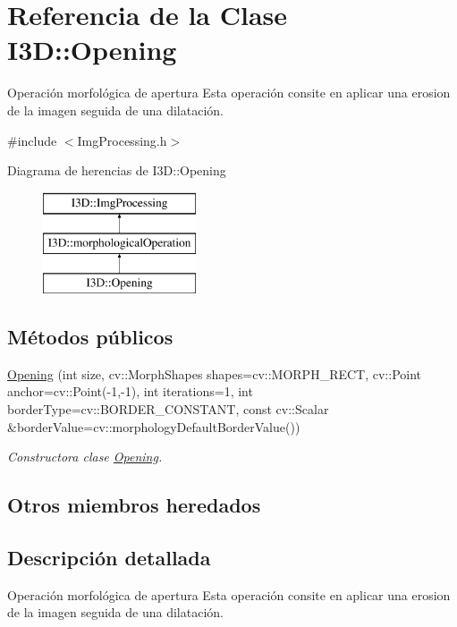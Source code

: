 \hypertarget{class_i3_d_1_1_opening}{}\section{Referencia de la Clase I3D\+:\+:Opening}
\label{class_i3_d_1_1_opening}


Operación morfológica de apertura Esta operación consite en aplicar una erosion de la imagen seguida de una dilatación.  




{\ttfamily \#include $<$Img\+Processing.\+h$>$}

Diagrama de herencias de I3D\+:\+:Opening\begin{figure}[H]
\begin{center}
\leavevmode
\includegraphics[height=3.000000cm]{class_i3_d_1_1_opening}
\end{center}
\end{figure}
\subsection*{Métodos públicos}
\begin{DoxyCompactItemize}
\item 
\hyperlink{class_i3_d_1_1_opening_aadbc4c4574ab7332a109d16deaee21bc}{Opening} (int size, cv\+::\+Morph\+Shapes shapes=cv\+::\+M\+O\+R\+P\+H\+\_\+\+R\+E\+CT, cv\+::\+Point anchor=cv\+::\+Point(-\/1,-\/1), int iterations=1, int border\+Type=cv\+::\+B\+O\+R\+D\+E\+R\+\_\+\+C\+O\+N\+S\+T\+A\+NT, const cv\+::\+Scalar \&border\+Value=cv\+::morphology\+Default\+Border\+Value())
\begin{DoxyCompactList}\small\item\em Constructora clase \hyperlink{class_i3_d_1_1_opening}{Opening}. \end{DoxyCompactList}\end{DoxyCompactItemize}
\subsection*{Otros miembros heredados}


\subsection{Descripción detallada}
Operación morfológica de apertura Esta operación consite en aplicar una erosion de la imagen seguida de una dilatación. 

